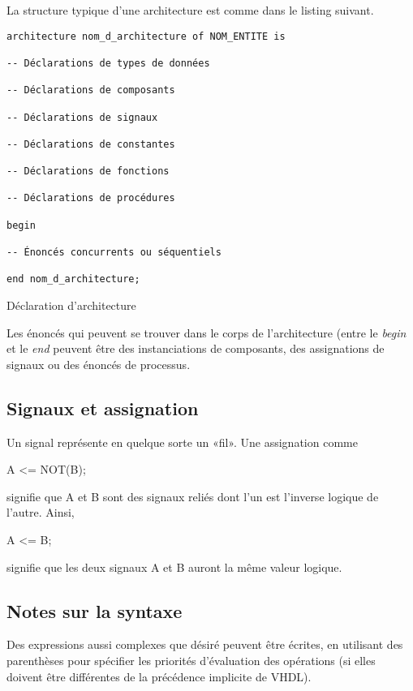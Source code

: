 \documentclass[11pt]{article}
\begin{document}
La structure typique d'une architecture est comme dans le listing suivant.

\begin{listing}[htbp]
\begin{verbatim}
architecture nom_d_architecture of NOM_ENTITE is

-- Déclarations de types de données

-- Déclarations de composants

-- Déclarations de signaux

-- Déclarations de constantes

-- Déclarations de fonctions

-- Déclarations de procédures

begin

-- Énoncés concurrents ou séquentiels

end nom_d_architecture;
\end{verbatim}
\caption{Déclaration d'architecture}
\end{listing}

Les énoncés qui peuvent se trouver dans le corps de l'architecture
(entre le \emph{begin} et le \emph{end} peuvent être des instanciations de
composants, des assignations de signaux ou des énoncés de processus.

\subsection{Signaux et assignation}
\label{sec:orgaaec225}

Un signal représente en quelque sorte un «fil». Une assignation comme

A <= NOT(B);

signifie que A et B sont des signaux reliés dont l'un est l'inverse
logique de l'autre.  Ainsi,

A <= B; 

signifie que les deux signaux A et B auront la même valeur logique.

\subsection{Notes sur la syntaxe}
\label{sec:org87e3e30}

Des expressions aussi complexes que désiré peuvent être écrites, en
utilisant des parenthèses pour spécifier les priorités d'évaluation
des opérations (si elles doivent être différentes de la précédence
implicite de VHDL).
\end{document}
